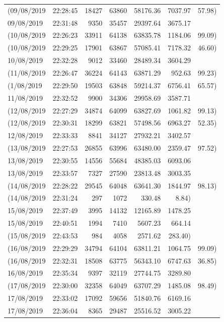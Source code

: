 \begin{longtable}{llrrrrr}
(09/08/2019 & 22:28:45 & 18427 & 63860 & 58176.36 & 7037.97 & 57.98) \\
09/08/2019 & 22:31:48 & 9350 & 35457 & 29397.64 & 3675.17 &  \\
(10/08/2019 & 22:26:23 & 33911 & 64138 & 63835.78 & 1184.06 & 99.09) \\
(10/08/2019 & 22:29:25 & 17901 & 63867 & 57085.41 & 7178.32 & 46.60) \\
10/08/2019 & 22:32:28 & 9012 & 33460 & 28489.34 & 3604.29 &  \\
(11/08/2019 & 22:26:47 & 36224 & 64143 & 63871.29 & 952.63 & 99.23) \\
(1/08/2019 & 22:29:50 & 19503 & 63848 & 59214.37 & 6756.41 & 65.57) \\
11/08/2019 & 22:32:52 & 9900 & 34306 & 29958.69 & 3587.71 &  \\
(12/08/2019 & 22:27:29 & 34874 & 64099 & 63827.69 & 1061.82 & 99.13) \\
(12/08/2019 & 22:30:31 & 18299 & 63821 & 57498.56 & 6963.27 & 52.35) \\
12/08/2019 & 22:33:33 & 8841 & 34127 & 27932.21 & 3402.57 &  \\
(13/08/2019 & 22:27:53 & 26855 & 63996 & 63480.00 & 2359.47 & 97.52) \\
13/08/2019 & 22:30:55 & 14556 & 55684 & 48385.03 & 6093.06 &  \\
13/08/2019 & 22:33:57 & 7327 & 27590 & 23813.48 & 3003.35 &  \\
(14/08/2019 & 22:28:22 & 29545 & 64048 & 63641.30 & 1844.97 & 98.13) \\
(14/08/2019 & 22:31:24 & 297 & 1072 & 330.48 & 8.84) &  \\
15/08/2019 & 22:37:49 & 3995 & 14132 & 12165.89 & 1478.25 &  \\
15/08/2019 & 22:40:51 & 1994 & 7410 & 5607.23 & 664.14 &  \\
(15/08/2019 & 22:43:53 & 984 & 4058 & 2571.62 & 283.40) &  \\
(16/08/2019 & 22:29:29 & 34794 & 64104 & 63811.21 & 1064.75 & 99.09) \\
(16/08/2019 & 22:32:31 & 18508 & 63775 & 56343.10 & 6747.63 & 36.85) \\
16/08/2019 & 22:35:34 & 9397 & 32119 & 27744.75 & 3289.80 &  \\
(17/08/2019 & 22:30:00 & 32358 & 64049 & 63707.29 & 1485.08 & 98.49) \\
17/08/2019 & 22:33:02 & 17092 & 59656 & 51840.76 & 6169.16 &  \\
17/08/2019 & 22:36:04 & 8365 & 29487 & 25516.52 & 3005.22 &  \\

\end{longtable}
